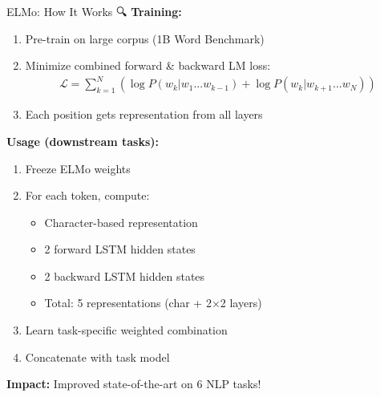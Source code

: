 \documentclass[aspectratio=169]{beamer}
\begin{document}
\begin{frame}[shrink=10]{ELMo: How It Works 🔍}
\textbf{Training:}

\vspace{0.5em}
\begin{enumerate}\setlength{\itemsep}{0pt}
    \item Pre-train on large corpus (1B Word Benchmark)
    \item Minimize combined forward \& backward LM loss:
    \begin{align*}
    \mathcal{L} = \sum_{k=1}^N \left(\log P(w_k | w_1...w_{k-1}) + \log P(w_k | w_{k+1}...w_N)\right)
    \end{align*}
    \item Each position gets representation from all layers
\end{enumerate}

\vspace{1em}

\textbf{Usage (downstream tasks):}

\vspace{0.5em}
\begin{enumerate}\setlength{\itemsep}{0pt}
    \item Freeze ELMo weights
    \item For each token, compute:
    \begin{itemize}\setlength{\itemsep}{0pt}
        \item Character-based representation
        \item 2 forward LSTM hidden states
        \item 2 backward LSTM hidden states
        \item Total: 5 representations (char + 2×2 layers)
    \end{itemize}
    \item Learn task-specific weighted combination
    \item Concatenate with task model
\end{enumerate}

\vspace{0.5em}
\textbf{Impact:} Improved state-of-the-art on 6 NLP tasks!
\end{frame}
\end{document}
